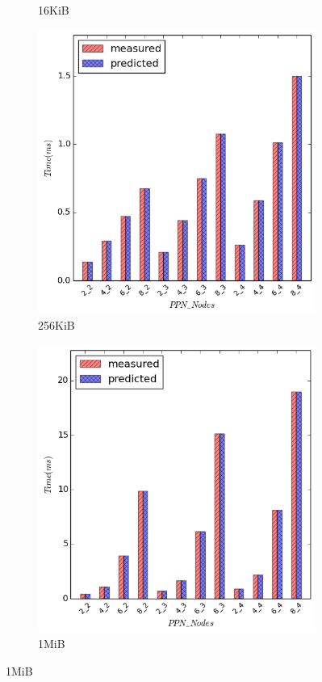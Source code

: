 \begin{figure}[H]
\begin{subfigure}[b]{0.4\textwidth}
        \caption{16KiB}
    \end{subfigure}
    \quad
        \begin{subfigure}[b]{0.4\textwidth}
        \includegraphics[width=\textwidth]{./images/scatter_NUMA/scatter_262144}
        \caption{256KiB}
    \end{subfigure}
    \quad
        \begin{subfigure}[b]{0.4\textwidth}
        \includegraphics[width=\textwidth]{./images/scatter_NUMA/scatter_1048576}
        \caption{1MiB}
    \end{subfigure}


\end{figure}
